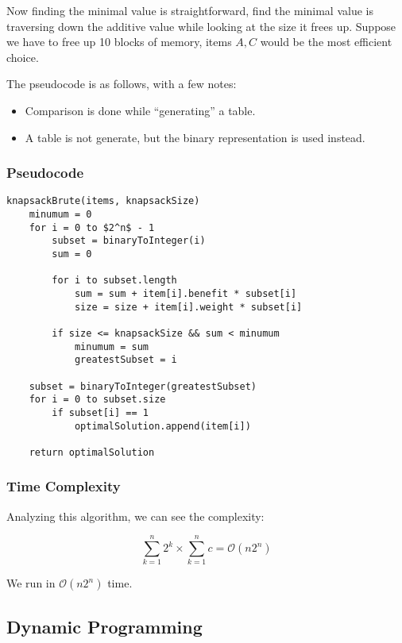 \documentclass{article}
\begin{document}
Now finding the minimal value is straightforward, find the minimal value is traversing down the additive value while looking at the size it frees up. Suppose we have to free up 10 blocks of memory, items $A, C$ would be the most efficient choice.

The pseudocode is as follows, with a few notes:

\begin{itemize}
    \item Comparison is done while ``generating'' a table.
    \item A table is not generate, but the binary representation is used instead.
\end{itemize}

\subsubsection{Pseudocode}
\begin{lstlisting}[mathescape]
knapsackBrute(items, knapsackSize)
    minumum = 0
    for i = 0 to $2^n$ - 1
        subset = binaryToInteger(i)
        sum = 0

        for i to subset.length
            sum = sum + item[i].benefit * subset[i]
            size = size + item[i].weight * subset[i]

        if size <= knapsackSize && sum < minumum
            minumum = sum
            greatestSubset = i

    subset = binaryToInteger(greatestSubset)
    for i = 0 to subset.size
        if subset[i] == 1
            optimalSolution.append(item[i])

    return optimalSolution
\end{lstlisting}

\subsubsection{Time Complexity}
Analyzing this algorithm, we can see the complexity:

\begin{equation}
    \sum _{k = 1} ^{n} 2^k \times \sum _{k = 1} ^{n} c = \mathcal{O}(n 2^n)
\end{equation}

We run in $\mathcal{O}(n 2^n)$ time.

\subsection{Dynamic Programming}
\end{document}
